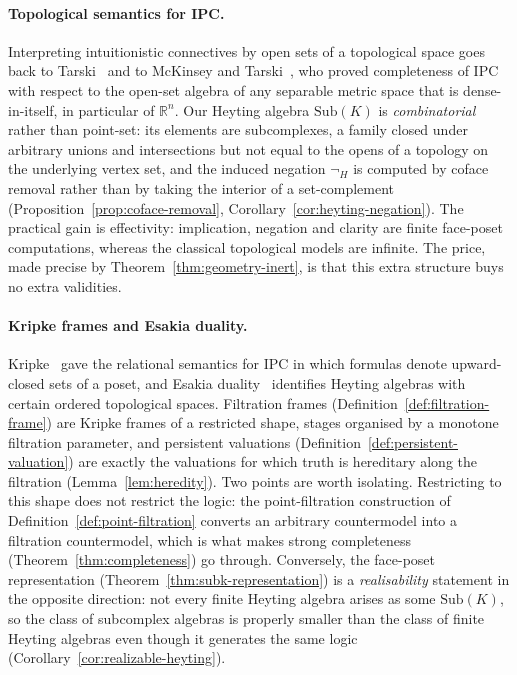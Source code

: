 \documentclass[final,12pt]{elsarticle}
\theoremstyle{plain}
\theoremstyle{definition}
\begin{document}
\paragraph{Topological semantics for IPC.}
Interpreting intuitionistic connectives by open sets of a topological space
goes back to Tarski~\cite{tarski1938} and to McKinsey and
Tarski~\cite{mckinseytarski1944}, who proved completeness of IPC with respect
to the open-set algebra of any separable metric space that is dense-in-itself,
in particular of \( \mathbb{R}^{n} \). Our Heyting algebra \( \mathrm{Sub}(K) \) is
\emph{combinatorial} rather than point-set: its elements are subcomplexes, a
family closed under arbitrary unions and intersections but not equal to the
opens of a topology on the underlying vertex set, and the induced negation
\( \neg_{H} \) is computed by coface removal rather than by taking the
interior of a set-complement (Proposition~\ref{prop:coface-removal},
Corollary~\ref{cor:heyting-negation}). The practical gain is effectivity:
implication, negation and clarity are finite face-poset computations, whereas
the classical topological models are infinite. The price, made precise by
Theorem~\ref{thm:geometry-inert}, is that this extra
structure buys no extra validities.

\paragraph{Kripke frames and Esakia duality.}
Kripke~\cite{kripke1965} gave the relational semantics for IPC in which
formulas denote upward-closed sets of a poset, and Esakia
duality~\cite{esakia2019} identifies Heyting algebras with certain ordered
topological spaces. Filtration frames (Definition~\ref{def:filtration-frame})
are Kripke frames of a restricted shape, stages organised by a monotone
filtration parameter, and persistent valuations
(Definition~\ref{def:persistent-valuation}) are exactly the valuations for
which truth is hereditary along the filtration
(Lemma~\ref{lem:heredity}). Two points are worth isolating. Restricting to
this shape does not restrict the logic: the point-filtration construction of
Definition~\ref{def:point-filtration} converts an arbitrary countermodel into
a filtration countermodel, which is what makes strong completeness
(Theorem~\ref{thm:completeness}) go through. Conversely, the face-poset
representation (Theorem~\ref{thm:subk-representation}) is a
\emph{realisability} statement in the opposite direction: not every finite
Heyting algebra arises as some \( \mathrm{Sub}(K) \), so the class of
subcomplex algebras is properly smaller than the class of finite Heyting
algebras even though it generates the same logic
(Corollary~\ref{cor:realizable-heyting}).
\end{document}
